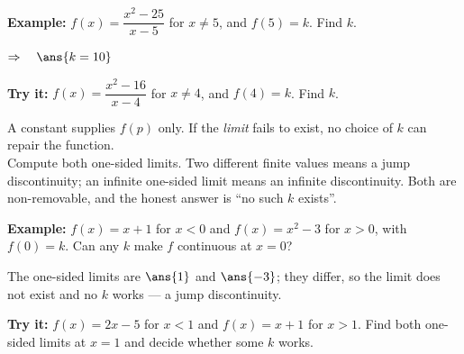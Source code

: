 \documentclass[12pt]{article}
\begin{document}
\begin{examplebox}
\textbf{Example:} $f(x) = \dfrac{x^2 - 25}{x - 5}$ for $x \neq 5$, and
$f(5) = k$. Find $k$.

$\Rightarrow\quad \ans{k = 10}$
\end{examplebox}

\begin{tryitbox}
\textbf{Try it:} $f(x) = \dfrac{x^2 - 16}{x - 4}$ for $x \neq 4$, and
$f(4) = k$. Find $k$.\\[2pt]
\end{tryitbox}


\begin{formulabox}
A constant supplies $f(p)$ only. If the \emph{limit} fails to exist, no choice
of $k$ can repair the function.\\[3pt]
Compute both one-sided limits. Two different finite values means a jump
discontinuity; an infinite one-sided limit means an infinite discontinuity.
Both are non-removable, and the honest answer is ``no such $k$ exists''.
\end{formulabox}

\begin{examplebox}
\textbf{Example:} $f(x) = x + 1$ for $x < 0$ and $f(x) = x^2 - 3$ for $x > 0$,
with $f(0) = k$. Can any $k$ make $f$ continuous at $x = 0$?

The one-sided limits are $\ans{1}$ and $\ans{-3}$; they differ, so the limit
does not exist and no $k$ works --- a jump discontinuity.
\end{examplebox}

\begin{tryitbox}
\textbf{Try it:} $f(x) = 2x - 5$ for $x < 1$ and $f(x) = x + 1$ for $x > 1$.
Find both one-sided limits at $x = 1$ and decide whether some $k$ works.\\[2pt]
\end{tryitbox}
\end{document}
